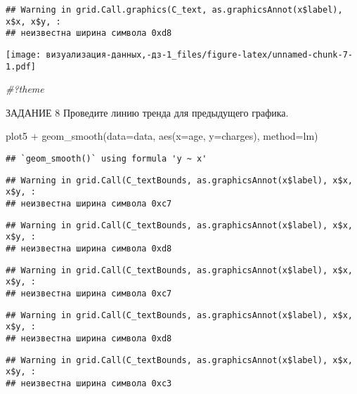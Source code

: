 \documentclass[
]{article}
\newenvironment{Shaded}{\begin{snugshade}}{\end{snugshade}}
\newcommand{\AttributeTok}[1]{\textcolor[rgb]{0.77,0.63,0.00}{#1}}
\newcommand{\CommentTok}[1]{\textcolor[rgb]{0.56,0.35,0.01}{\textit{#1}}}
\newcommand{\FunctionTok}[1]{\textcolor[rgb]{0.00,0.00,0.00}{#1}}
\newcommand{\NormalTok}[1]{#1}
\newcommand{\SpecialCharTok}[1]{\textcolor[rgb]{0.00,0.00,0.00}{#1}}
\begin{document}
\begin{verbatim}
## Warning in grid.Call.graphics(C_text, as.graphicsAnnot(x$label), x$x, x$y, :
## неизвестна ширина символа 0xd8
\end{verbatim}

\texttt{[image: визуализация-данных,-дз-1\_files/figure-latex/unnamed-chunk-7-1.pdf]}

\begin{Shaded}
\begin{Highlighting}[]
\CommentTok{\#?theme}
\end{Highlighting}
\end{Shaded}

ЗАДАНИЕ 8 Проведите линию тренда для предыдущего графика.

\begin{Shaded}
\begin{Highlighting}[]
\NormalTok{plot5 }\SpecialCharTok{+} 
  \FunctionTok{geom\_smooth}\NormalTok{(}\AttributeTok{data=}\NormalTok{data, }\FunctionTok{aes}\NormalTok{(}\AttributeTok{x=}\NormalTok{age, }\AttributeTok{y=}\NormalTok{charges), }\AttributeTok{method=}\NormalTok{lm)}
\end{Highlighting}
\end{Shaded}

\begin{verbatim}
## `geom_smooth()` using formula 'y ~ x'
\end{verbatim}

\begin{verbatim}
## Warning in grid.Call(C_textBounds, as.graphicsAnnot(x$label), x$x, x$y, :
## неизвестна ширина символа 0xc7
\end{verbatim}

\begin{verbatim}
## Warning in grid.Call(C_textBounds, as.graphicsAnnot(x$label), x$x, x$y, :
## неизвестна ширина символа 0xd8
\end{verbatim}

\begin{verbatim}
## Warning in grid.Call(C_textBounds, as.graphicsAnnot(x$label), x$x, x$y, :
## неизвестна ширина символа 0xc7
\end{verbatim}

\begin{verbatim}
## Warning in grid.Call(C_textBounds, as.graphicsAnnot(x$label), x$x, x$y, :
## неизвестна ширина символа 0xd8
\end{verbatim}

\begin{verbatim}
## Warning in grid.Call(C_textBounds, as.graphicsAnnot(x$label), x$x, x$y, :
## неизвестна ширина символа 0xc3
\end{verbatim}
\end{document}
